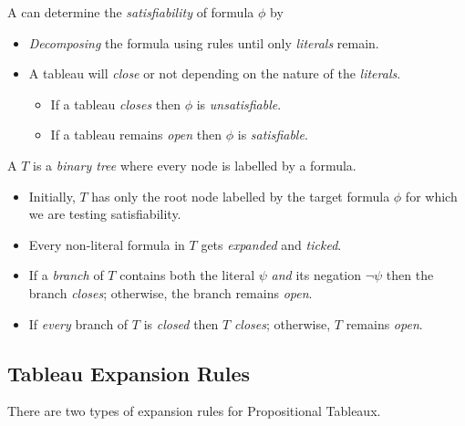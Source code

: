 \begin{definition}[Tableau]
    A  can determine the \textit{satisfiability} of formula
    $\phi$ by
    
    \begin{itemize}
        \item \textit{Decomposing} the formula using rules until only
            \textit{literals} remain.
        \item A tableau will \textit{close} or not depending on the
            nature of the \textit{literals}.
        \begin{itemize}
            \item If a tableau \textit{closes} then $\phi$ is
                \textit{unsatisfiable}.
            \item If a tableau remains \textit{open} then $\phi$ is
                \textit{satisfiable}.
        \end{itemize}
    \end{itemize}
    
    A  $T$ is a \textit{binary tree} where every node is 
    labelled by a formula.
    
    \begin{itemize}
        \item Initially, $T$ has only the root node labelled by the target 
            formula $\phi$ for which we are testing satisfiability.
        \item Every non-literal formula in $T$ gets \textit{expanded} and
            \textit{ticked}.
        \item If a \textit{branch} of $T$ contains both the literal $\psi$ 
            \textit{and} its negation $\neg \psi$ then the branch
            \textit{closes}; otherwise, the branch remains \textit{open}.
        \item If \textit{every} branch of $T$ is \textit{closed} then $T$
            \textit{closes}; otherwise, $T$ remains \textit{open}.
    \end{itemize}
\end{definition}

\subsection{Tableau Expansion Rules}

There are two types of expansion rules for Propositional Tableaux.


